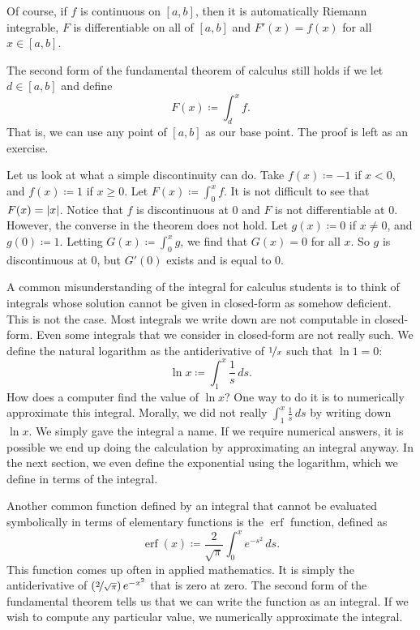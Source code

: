 Of course, if $f$ is continuous on $[a,b]$, then it is automatically Riemann
integrable, $F$ is differentiable on all of $[a,b]$ and $F'(x) = f(x)$ for
all $x \in [a,b]$.

\begin{remark} \label{remark:fundthmbase}
The second form of the fundamental theorem of calculus still holds if
we let $d \in [a,b]$ and define
\begin{equation*}
F(x) \coloneqq \int_d^x f .
\end{equation*}
That is, we can use any point of $[a,b]$ as our base point.  The proof is
left as an exercise.
\end{remark}

Let us look at what a simple discontinuity can do.  Take $f(x) \coloneqq -1$ if $x
< 0$, and $f(x) \coloneqq 1$ if $x \geq 0$.  Let $F(x) \coloneqq \int_0^x f$.  It is not
difficult to see that $F(x) = \lvert {x} \rvert$.  Notice that $f$ is discontinuous at
$0$ and $F$ is not differentiable at $0$.  However, the converse in the
theorem does not
hold.
Let $g(x) \coloneqq 0$ if $x \neq 0$, and $g(0) \coloneqq 1$.
Letting $G(x) \coloneqq \int_0^x g$,
we find that $G(x) = 0$ for all $x$.  So $g$ is discontinuous
at $0$, but $G'(0)$ exists and is equal to 0.

A common misunderstanding of the integral for calculus students is to
think of integrals whose solution cannot be given in closed-form as somehow
deficient.  This is not the case.  Most integrals we write down are not
computable in closed-form.  Even some integrals that we consider
in closed-form are not really such.  We define
the natural logarithm as the antiderivative of $\nicefrac{1}{x}$
such that $\ln 1 = 0$:
\begin{equation*}
\ln x \coloneqq \int_1^x \frac{1}{s}\,ds .
\end{equation*}
How does a computer find the value of $\ln x$?
One way to do it is to numerically approximate this integral.
Morally,
we did not really  $\int_1^x \frac{1}{s}\,ds$ by
writing down $\ln x$.  We simply gave the integral a name.
If we require numerical answers,
it is possible we end up doing
the calculation by approximating an integral anyway.
In the next section, we even define the exponential using
the logarithm, which we define in terms of the integral.

Another common function defined by an integral that cannot
be evaluated symbolically in terms of elementary functions
is the $\operatorname{erf}$ function, defined as
\begin{equation*}
\operatorname{erf}(x) \coloneqq \frac{2}{\sqrt{\pi}} \int_0^x e^{-s^2} \,ds .
\end{equation*}
This function comes up often in applied mathematics.  It is simply 
the antiderivative of $\left(\nicefrac{2}{\sqrt{\pi}}\right) e^{-x^2}$
that is zero at zero.
The second form of the fundamental theorem tells us that we can write the function
as an integral.  If we wish to compute any particular value, we 
numerically approximate the integral.

